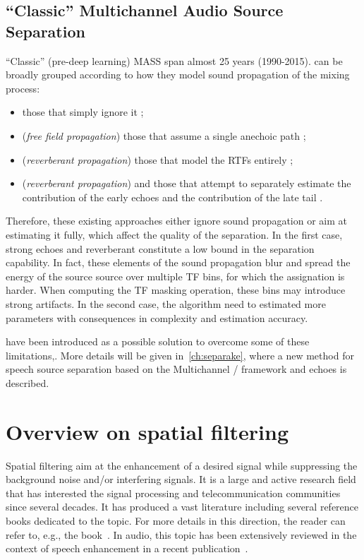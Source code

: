 \subsection{``Classic'' Multichannel Audio Source Separation}
``Classic'' (pre-deep learning) \ac{MASS} span almost 25 years (1990-2015).
 can be broadly grouped according to how they model sound propagation of the mixing process:
\begin{itemize}
    \item those that simply ignore it ;
    \item (\textit{free field propagation}) those that assume a single anechoic path  ;
    \item (\textit{reverberant propagation}) those that model the \acp{RTF} entirely ;
    \item (\textit{reverberant propagation}) and those that attempt to separately estimate the contribution of the early echoes and the contribution of the late tail .
\end{itemize}
Therefore, these existing approaches either ignore sound propagation or aim at estimating it fully, which affect the quality of the separation.
In the first case, strong echoes and reverberant constitute a low bound in the separation capability.
In fact, these elements of the sound propagation blur and spread the energy of the source source over multiple \ac{TF} bins, for which the assignation is harder.
When computing the \ac{TF} masking operation, these bins may introduce strong artifacts.
In the second case, the algorithm need to estimated more parameters with consequences in complexity and estimation accuracy.

 have been introduced as a possible solution to overcome some of these limitations,.
More details will be given in~\cref{ch:separake}, where a new method for speech source separation based on the Multichannel \NMF/ framework and echoes is described.

\section{Overview on spatial filtering}\label{sec:application:filtering}
Spatial filtering aim at the enhancement of a desired signal while suppressing the background noise and/or interfering signals.
It is a large and active research field that has interested the signal processing and telecommunication communities since several decades.
It has produced a vast literature including several reference books dedicated to the topic.
For more details in this direction, the reader can refer to, e.g., the book~.
In audio, this topic has been extensively reviewed in the context of speech enhancement in a recent publication~.

